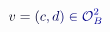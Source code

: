 \documentclass[12pt]{article}
\begin{document}
\makeatletter
\renewcommand*{\@textcolor}[3]{%
  \protect\leavevmode
  \begingroup
    \color#1{#2}#3%
  \endgroup
}
\makeatother
\begin{displaymath}
\mathcolor[RGB]{0,0,15}{v} \mathcolor[RGB]{0,0,30}{=} \mathcolor[RGB]{0,0,45}{(} \mathcolor[RGB]{0,0,60}{c} \mathcolor[RGB]{0,0,75}{,} \mathcolor[RGB]{0,0,90}{d} \mathcolor[RGB]{0,0,105}{)} \mathcolor[RGB]{0,0,120}{\in} \mathcal { \mathcolor[RGB]{0,0,135}{O} } _ { \mathcolor[RGB]{0,0,150}{B} } ^ { \mathcolor[RGB]{0,0,165}{2} }
\end{displaymath}
\end{document}
